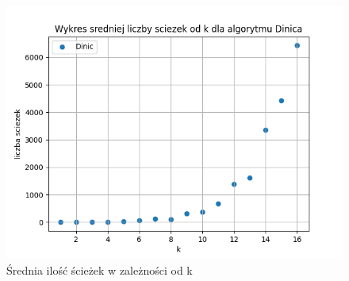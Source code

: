 \documentclass{report}
\begin{document}
\begin{figure}[H]
    \centering
    \includegraphics[scale=0.55]{../ex1_and_4/plots/dinic_paths.png}
    \caption{Średnia ilość ścieżek w zależności od k}
\end{figure}
\end{document}
